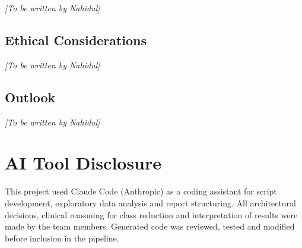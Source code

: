 \documentclass[11pt,a4paper]{article}
\begin{document}
\textit{[To be written by Nahidul]}

\subsection{Ethical Considerations}

\textit{[To be written by Nahidul]}

\subsection{Outlook}

\textit{[To be written by Nahidul]}

\appendix

\section{AI Tool Disclosure}
\label{app:ai}

This project used Claude Code (Anthropic) as a coding assistant for script development, exploratory data analysis and report structuring. All architectural decisions, clinical reasoning for class reduction and interpretation of results were made by the team members. Generated code was reviewed, tested and modified before inclusion in the pipeline.
\end{document}
